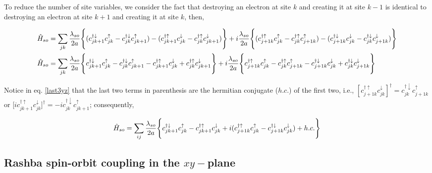 \documentclass[10pt,prb,showpacs,amssymb,floatfix]{revtex4-1}
\begin{document}
To reduce the number of site variables, we consider the fact that destroying an electron at site $k$ and creating it at site $k-1$ is identical to destroying an electron at site $k+1$ and creating it at site $k$, then,

\begin{align}
\hat H_{so} &= \sum_{jk} \frac{\lambda_{so}}{2a}  \Bigg{\{}   (c_{jk+1}^{\dagger \downarrow} c_{jk}^\uparrow  - c_{jk}^{\dagger \downarrow} c_{jk+1}^\uparrow) - ( c_{jk+1}^{\dagger \uparrow} c_{jk}^\downarrow  - c_{jk}^{\dagger \uparrow} c_{jk+1}^\downarrow ) \Bigg{\}}  +i\frac{\lambda_{so}}{2a} \Bigg{\{}  (c_{j+1k}^{\dagger \uparrow} c_{jk}^\uparrow  - c_{jk}^{\dagger \uparrow} c_{j+1k}^\uparrow) -  ( c_{j+1k}^{\dagger \downarrow} c_{jk}^\downarrow - c_{jk}^{\dagger \downarrow} c_{j+1k}^\downarrow) \Bigg{\}}\\
\hat H_{so} &= \sum_{jk} \frac{\lambda_{so}}{2a}  \Bigg{\{}   c_{jk+1}^{\dagger \downarrow} c_{jk}^\uparrow  - c_{jk}^{\dagger \downarrow} c_{jk+1}^\uparrow -  c_{jk+1}^{\dagger \uparrow} c_{jk}^\downarrow  + c_{jk}^{\dagger \uparrow} c_{jk+1}^\downarrow  \Bigg{\}}  +i\frac{\lambda_{so}}{2a} \Bigg{\{}  c_{j+1k}^{\dagger \uparrow} c_{jk}^\uparrow  - c_{jk}^{\dagger \uparrow} c_{j+1k}^\uparrow -  c_{j+1k}^{\dagger \downarrow} c_{jk}^\downarrow + c_{jk}^{\dagger \downarrow} c_{j+1k}^\downarrow \Bigg{\}}
\label{last3yz}
\end{align}

Notice in eq. \eqref{last3yz} that the last two terms in parenthesis are the hermitian conjugate ($h.c.$) of the first two, i.e., $[c_{j+1k}^{\dagger \uparrow} c_{jk}^\downarrow ]^\dagger =  c_{jk}^{\dagger \downarrow} c_{j+1k}^{\uparrow}$ or [$i c_{jk+1}^{\dagger \uparrow} c_{jk}^\downarrow ]^\dagger = -ic_{jk}^{\dagger \downarrow}c_{jk+1}^{\uparrow}$; consequently,

\begin{align}
\hat H_{so} = \sum_{ij} \frac{\lambda_{so}}{2a}  \Bigg{\{} c_{jk+1}^{\dagger \downarrow} c_{jk}^\uparrow  - c_{jk+1}^{\dagger \uparrow} c_{jk}^\downarrow + i (c_{j+1k}^{\dagger \uparrow} c_{jk}^\uparrow  - c_{j+1k}^{\dagger \downarrow} c_{jk}^\downarrow ) + h.c. \Bigg{\}}
\label{last4yz}
\end{align}




\subsection{Rashba spin-orbit coupling in the $xy-$plane}
\end{document}
